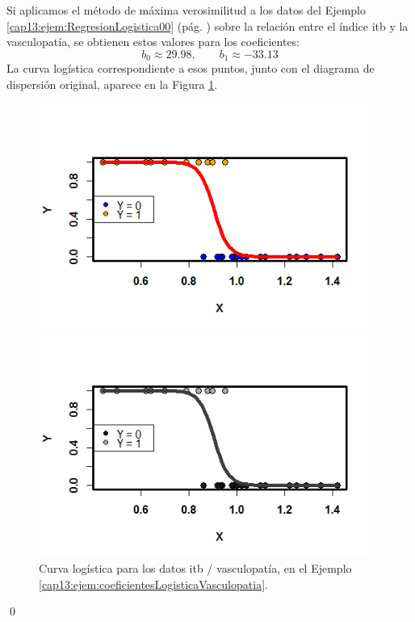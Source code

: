 \begin{ejemplo}
\label{cap13:ejem:coeficientesLogisticaVasculopatia}
Si aplicamos el método de máxima verosimilitud a los datos del Ejemplo \ref{cap13:ejem:RegresionLogistica00} (pág. \pageref{cap13:ejem:RegresionLogistica00}) sobre la relación entre el índice itb y la vasculopatía, se obtienen estos valores para los coeficientes:
\[
b_0 \approx 29.98, \qquad b_1 \approx -33.13
\]
La curva logística correspondiente a esos puntos, junto con el diagrama de dispersión original, aparece en la Figura \ref{cap13:fig:CurvaLogisticaVasculopatia}.

\begin{figure}[h!]
\begin{center}
\begin{enColor}
\includegraphics[width=11cm]{../fig/Cap13-CurvaLogisticaVasculopatia.png}
\end{enColor}
\begin{bn}
\includegraphics[width=11cm]{../fig/Cap13-CurvaLogisticaVasculopatia-bn.png}
\end{bn}
\caption{Curva logística para los datos itb / vasculopatía, en el
Ejemplo \ref{cap13:ejem:coeficientesLogisticaVasculopatia}. }
\label{cap13:fig:CurvaLogisticaVasculopatia}
\end{center}
\end{figure}
\qed
\end{ejemplo}



